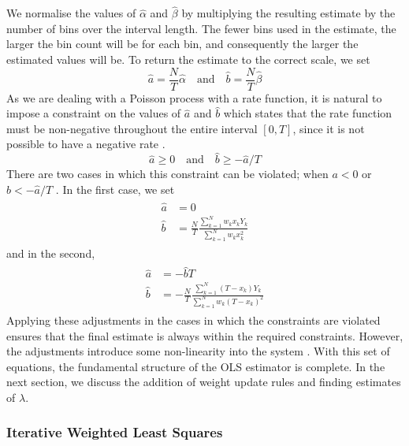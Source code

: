\documentclass[a4paper,11pt]{article}
\begin{document}
    We normalise the values of $\hat{\alpha}$ and $\hat{\beta}$ by multiplying
    the resulting estimate by the number of bins over the interval length. The
    fewer bins used in the estimate, the larger the bin count will be for each
    bin, and consequently the larger the estimated values will be. To return the
    estimate to the correct scale, we set
    \begin{equation}
    \hat{a}=\frac{N}{T}\hat{\alpha}\quad\text{and}\quad
    \hat{b}=\frac{N}{T}\hat{\beta}
    \end{equation}
    As we are dealing with a Poisson process with a rate function, it is natural
    to impose a constraint on the values of $\hat{a}$ and $\hat{b}$ which states
    that the rate function must be non-negative throughout the entire interval
    $[0,T]$, since it is not possible to have a negative rate
    \cite{massey1996estimating}.
    \begin{equation}
    \hat{a}\geq 0\quad \text{and}\quad
    \hat{b}\geq -\hat{a}/T
    \end{equation}
    There are two cases in which this constraint can be violated; when $a<0$ or
    $b<-\hat{a}/T$ \cite{massey1996estimating}. In the first case, we set
    \begin{align}
    \begin{split}
    \hat{a}&=0\\
    \hat{b}&=\frac{N}{T}\frac{\displaystyle \sum_{k=1}^N w_kx_kY_k}{\displaystyle\sum_{k=1}^N w_kx_k^2}
    \end{split}
    \end{align}
    and in the second,
    \begin{align}
    \begin{split}
    \hat{a}&=-\hat{b}T\\
    \hat{b}&=-\frac{N}{T}\frac{\displaystyle \sum_{k=1}^N (T-x_k)Y_k}{\displaystyle \sum_{k=1}^N w_k(T-x_k)^2}
    \end{split}
    \end{align}
    Applying these adjustments in the cases in which the constraints are
    violated ensures that the final estimate is always within the required
    constraints. However, the adjustments introduce some non-linearity into the
    system \cite{massey1996estimating}. With this set of equations, the
    fundamental structure of the OLS estimator is complete. In the next section,
    we discuss the addition of weight update rules and finding estimates of
    $\lambda$.
\subsubsection{Iterative Weighted Least Squares}
\label{sec-4-1-2}
\end{document}
